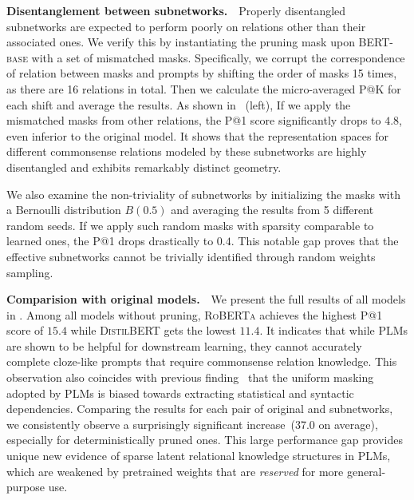 \noindent
\textbf{Disentanglement between subnetworks.}~~Properly disentangled subnetworks are expected to perform poorly on relations other than their associated ones. We verify this by instantiating the pruning mask upon \textsc{BERT-base} with a set of mismatched masks.
Specifically, we corrupt the correspondence of relation between masks and prompts by shifting the order of masks 15 times, as there are 16 relations in total. Then we calculate the micro-averaged P@K for each shift and average the results. As shown in ~(left), If we apply the mismatched masks from other relations, the P@1  score significantly drops to $4.8$, even inferior to the original model. It shows that the representation spaces for different commonsense relations modeled by these subnetworks are highly disentangled and  exhibits remarkably distinct geometry.

We also examine the non-triviality of subnetworks by initializing the masks with a Bernoulli distribution $B(0.5)$ and averaging the results from 5 different random seeds.
If we apply such random masks with sparsity comparable to learned ones, the P@1 drops drastically to $0.4$. This notable gap proves that the effective subnetworks cannot be trivially identified through random weights sampling.

\noindent
\textbf{Comparision with original models.}~~We present the full results of all models in . Among all models without pruning, \textsc{RoBERTa} achieves the highest P@1 score of $15.4$ while \textsc{DistilBERT} gets the lowest $11.4$. It indicates that while PLMs are shown to be helpful for downstream learning, they cannot accurately complete cloze-like prompts that require commonsense relation knowledge. This observation also coincides with previous finding~\citep{inductivemlm} that the uniform masking adopted by PLMs is biased towards extracting statistical and syntactic dependencies. 
Comparing the results for each pair of original and subnetworks, we consistently observe a surprisingly significant increase~(37.0 on average), especially for deterministically pruned ones. This large performance gap provides unique new evidence of sparse latent relational knowledge structures in PLMs, which are weakened by pretrained weights that are \textit{reserved} for more general-purpose use. 

